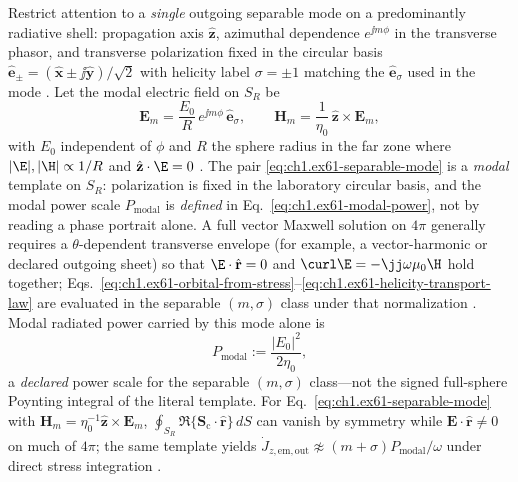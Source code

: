 Restrict attention to a \emph{single} outgoing separable mode on a predominantly radiative shell: propagation axis $\hat{\mathbf{z}}$, azimuthal dependence $e^{\jj m\phi}$ in the transverse phasor, and transverse polarization fixed in the circular basis $\hat{\mathbf{e}}_\pm=(\hat{\mathbf{x}}\pm\jj\hat{\mathbf{y}})/\sqrt{2}$ with helicity label $\sigma=\pm1$ matching the $\hat{\mathbf{e}}_\sigma$ used in the mode \cite{stratton1941,allen1992}. Let the modal electric field on $S_R$ be
\begin{equation}
\label{eq:ch1.ex61-separable-mode}
\mathbf{E}_m=\frac{E_0}{R}\,e^{\jj m\phi}\,\hat{\mathbf{e}}_\sigma,
\qquad
\mathbf{H}_m=\frac{1}{\eta_0}\,\hat{\mathbf{z}}\times\mathbf{E}_m,
\end{equation}
with $E_0$ independent of $\phi$ and $R$ the sphere radius in the far zone where $|\E|,|\H|\propto 1/R$ and $\hat{\mathbf{z}}\cdot\E=0$ \cite{stratton1941}. The pair \eqref{eq:ch1.ex61-separable-mode} is a \emph{modal} template on $S_R$: polarization is fixed in the laboratory circular basis, and the modal power scale $P_{\mathrm{modal}}$ is \emph{defined} in Eq.~\eqref{eq:ch1.ex61-modal-power}, not by reading a phase portrait alone. A full vector Maxwell solution on $4\pi$ generally requires a $\theta$-dependent transverse envelope (for example, a vector-harmonic or declared outgoing sheet) so that $\E\cdot\hat{\mathbf{r}}=0$ and $\curl\E=-\jj\omega\mu_0\H$ hold together; Eqs.~\eqref{eq:ch1.ex61-orbital-from-stress}--\eqref{eq:ch1.ex61-helicity-transport-law} are evaluated in the separable $(m,\sigma)$ class under that normalization \cite{stratton1941,allen1992}. Modal radiated power carried by this mode alone is
\begin{equation}
\label{eq:ch1.ex61-modal-power}
P_{\mathrm{modal}}:=\frac{|E_0|^2}{2\eta_0},
\end{equation}
a \emph{declared} power scale for the separable $(m,\sigma)$ class---not the signed full-sphere Poynting integral of the literal template. For Eq.~\eqref{eq:ch1.ex61-separable-mode} with $\mathbf{H}_m=\eta_0^{-1}\hat{\mathbf{z}}\times\mathbf{E}_m$, $\oint_{S_R}\Re\{\mathbf{S}_\mathrm{c}\cdot\hat{\mathbf{r}}\}\,dS$ can vanish by symmetry while $\mathbf{E}\cdot\hat{\mathbf{r}}\neq0$ on much of $4\pi$; the same template yields $\dot J_{z,\mathrm{em,out}}\not\approx(m+\sigma)P_{\mathrm{modal}}/\omega$ under direct stress integration \cite{stratton1941}.

